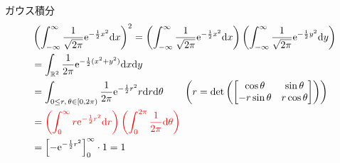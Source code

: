 \documentclass[lualatex,handout]{beamer}
\newcommand{\mycolor}[2]{%
  \begingroup
  \colorlet{currentcolor}{.}%
  \color{#1}#2%
  \color{currentcolor}%
  \endgroup
}
\newcommand{\emm}[1]{\mycolor{red}{#1}}
\theoremstyle{definition}
\begin{document}
\begin{frame}{ガウス積分}
\begin{align*}
&\left(\int_{-\infty}^\infty \frac1{\sqrt{2\pi}}\mathrm{e}^{-\frac12x^2}\mathrm{d}x\right)^2
=
\left(\int_{-\infty}^\infty \frac1{\sqrt{2\pi}}\mathrm{e}^{-\frac12x^2}\mathrm{d}x\right)
\left(\int_{-\infty}^\infty \frac1{\sqrt{2\pi}}\mathrm{e}^{-\frac12y^2}\mathrm{d}y\right)\\
&=
\int_{\mathbb{R}^2} \frac1{2\pi}\mathrm{e}^{-\frac12(x^2+y^2)}\mathrm{d}x\mathrm{d}y\\
&=
\int_{0\le r,\, \theta\in[0,2\pi)} \frac1{2\pi}\mathrm{e}^{-\frac12r^2}r\mathrm{d}r\mathrm{d}\theta\qquad \left(r = \det\left(\begin{bmatrix}\cos\theta&\sin\theta\\-r\sin\theta&r\cos\theta\end{bmatrix}\right)\right)\\
&=
\emm{
\left(\int_{0}^\infty r\mathrm{e}^{-\frac12r^2}\mathrm{d}r\right)
\left(\int_0^{2\pi} \frac1{2\pi}\mathrm{d}\theta\right)}\\
&=\left[-\mathrm{e}^{-\frac12r^2}\right]_0^\infty\cdot 1 = 1
\end{align*}
\end{frame}
\end{document}
